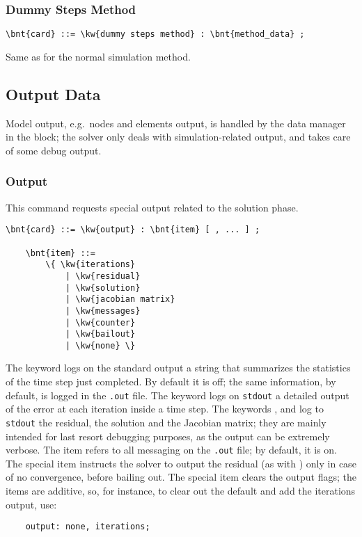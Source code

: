 \subsubsection{Dummy Steps Method}
\begin{Verbatim}[commandchars=\\\{\}]
    \bnt{card} ::= \kw{dummy steps method} : \bnt{method_data} ;
\end{Verbatim}
Same as for the normal simulation method. 

\subsection{Output Data}\label{sec:PROBLEMS:OUTPUT}
Model output, e.g.\ nodes and elements output, is handled
by the data manager in the  block;
the solver only deals with simulation-related output,
and takes care of some debug output.

\subsubsection{Output}
This command requests special output related to the solution phase.
\begin{Verbatim}[commandchars=\\\{\}]
    \bnt{card} ::= \kw{output} : \bnt{item} [ , ... ] ;

    \bnt{item} ::=
        \{ \kw{iterations}
            | \kw{residual}
            | \kw{solution}
            | \kw{jacobian matrix}
            | \kw{messages}
            | \kw{counter}
            | \kw{bailout}
            | \kw{none} \}
\end{Verbatim}
The keyword  logs on the standard output a string
that summarizes the statistics of the time step just completed.
By default it is off; the same information, by default,
is logged in the \texttt{.out} file.
The keyword  logs on \texttt{stdout}
a detailed output of the error at each iteration inside a time step.
The keywords ,  and 
log to \texttt{stdout} the residual, the solution and the Jacobian matrix;
they are mainly intended for last resort debugging purposes,
as the output can be extremely verbose.
The item  refers to all messaging on the \texttt{.out} file;
by default, it is on.
The special item  instructs the solver to output the residual
(as with ) only in case of no convergence, before bailing out.
The special item  clears the output flags; the items
are additive, so, for instance, to clear out the default 
and add the iterations output, use:
\begin{verbatim}
    output: none, iterations;
\end{verbatim}

